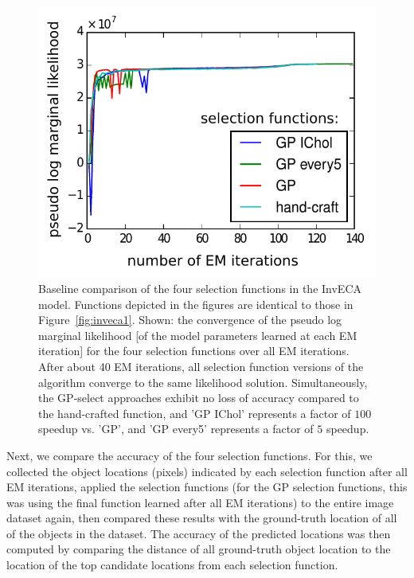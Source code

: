 \begin{figure}[ht!]%
\centering
\includegraphics[width=.6\textwidth]{inveca/inveca_L_js.pdf}%
\caption{Baseline comparison of the four selection functions in the InvECA model.
Functions depicted in the figures are identical to those in Figure~\ref{fig:inveca1}.
%
Shown: the convergence of the pseudo log marginal likelihood [of the model parameters learned at each EM iteration] for the four selection functions over all EM iterations. After about 40 EM iterations, all selection function versions of the algorithm converge to the same likelihood solution.  
Simultaneously, the GP-select approaches exhibit no loss of accuracy compared to the hand-crafted function,  and 
'GP IChol' represents a factor of $100$ speedup vs. 'GP', and 'GP every5' represents a factor of $5$ speedup.
}
\label{fig:inveca2}
\end{figure}
%
Next, we compare the accuracy of the four selection functions.
For this, we collected the object locations (pixels) indicated by each selection function after all EM iterations, 
applied the selection functions (for the GP selection functions, this was using the final function learned after all EM iterations) to the entire image dataset again, 
then compared these results with the ground-truth location of all of the objects in the dataset.
%
%
The accuracy of the predicted locations was then computed by comparing the distance of all ground-truth object location to the location of the top candidate locations from each selection function. %

